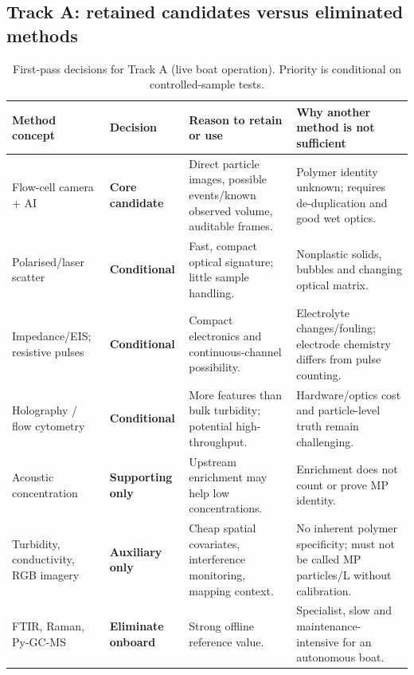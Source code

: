 \documentclass[10pt,a4paper]{article}
\begin{document}
\subsection{Track A: retained candidates versus eliminated methods}
\begin{table}[H]\centering\footnotesize
\caption{First-pass decisions for Track A (live boat operation). Priority is conditional on controlled-sample tests.}\label{tab:Ascreen}
\begin{tabularx}{\linewidth}{@{}L{3.2cm}L{2.2cm}YY@{}}\toprule
{}\textbf{Method concept} & \textbf{Decision} & \textbf{Reason to retain or use} & \textbf{Why another method is not sufficient} \\\midrule
Flow-cell camera + AI \cite{Microflow2023,Lee2022,UrbanCNN2024} & \textbf{Core candidate} & Direct particle images, possible events/known observed volume, auditable frames. & Polymer identity unknown; requires de-duplication and good wet optics.\\
Polarised/laser scatter \cite{Polarized2021} & \textbf{Conditional} & Fast, compact optical signature; little sample handling. & Nonplastic solids, bubbles and changing optical matrix.\\
Impedance/EIS; resistive pulses \cite{Blevins2021,Kim2024,Warraich2025} & \textbf{Conditional} & Compact electronics and continuous-channel possibility. & Electrolyte changes/fouling; electrode chemistry differs from pulse counting.\\
Holography / flow cytometry \cite{Wang2024} & \textbf{Conditional} & More features than bulk turbidity; potential high-throughput. & Hardware/optics cost and particle-level truth remain challenging.\\
Acoustic concentration \cite{Ohori2025} & \textbf{Supporting only} & Upstream enrichment may help low concentrations. & Enrichment does not count or prove MP identity.\\
Turbidity, conductivity, RGB imagery \cite{MPWE00002,MPWE04211} & \textbf{Auxiliary only} & Cheap spatial covariates, interference monitoring, mapping context. & No inherent polymer specificity; must not be called MP particles/L without calibration.\\
FTIR, Raman, Py-GC-MS \cite{Sefiloglu2024} & \textbf{Eliminate onboard} & Strong offline reference value. & Specialist, slow and maintenance-intensive for an autonomous boat.\\
\bottomrule\end{tabularx}
\end{table}
\end{document}
